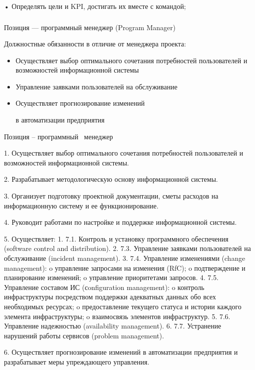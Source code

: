 \documentclass{../industrial-development}
\begin{document}
•	Определять цели и KPI, достигать их вместе с командой;



\begin{frame} \frametitle{}
 \begin{block}{}
  \alert{Позиция --- программный менеджер (Program Manager)}

Должностные обязанности в отличие от менеджера проекта: 
  \end{block}
  \begin{itemize}
  \item Осуществляет выбор оптимального сочетания потребностей пользователей и возможностей информационной системы
 \item Управление заявками пользователей на обслуживание
 \item Осуществляет прогнозирование изменений 

в автоматизации предприятия
  \end{itemize}
\end{frame}

\lecturenotes

Позиция – программный~\cite{hh} менеджер~\cite{itcf}~\cite{rab}

1.	Осуществляет выбор оптимального сочетания потребностей пользователей и возможностей информационной системы.

2.	Разрабатывает методологическую основу информационной системы.

3.	Организует подготовку проектной документации, сметы расходов на информационную систему и ее функционирование.

4.	Руководит работами по настройке и поддержке информационной системы.

5.	Осуществляет:
1.	7.1. Контроль и установку программного обеспечения (software control and distribution).
2.	7.3. Управление заявками пользователей на обслуживание (incident management).
3.	7.4. Управление изменениями (change management):
o	управление запросами на изменения (RfC);
o	подтверждение и планирование изменений;
o	управление приоритетами запросов.
4.	7.5. Управление составом ИС (сonfiguration management):
o	контроль инфраструктуры посредством поддержки адекватных данных обо всех необходимых ресурсах;
o	предоставление текущего статуса и истории каждого элемента инфраструктуры;
o	взаимосвязь элементов инфраструктур.
5.	7.6. Управление надежностью (availability management).
6.	7.7. Устранение нарушений работы сервисов (problem management).

6.	Осуществляет прогнозирование изменений в автоматизации предприятия и разрабатывает меры упреждающего управления.
\end{document}
